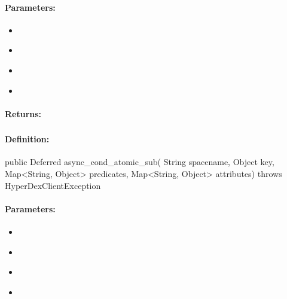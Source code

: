 \paragraph{Parameters:}
\begin{itemize}[noitemsep]
\item {}\\

\item {}\\

\item {}\\

\item {}\\

\end{itemize}

\paragraph{Returns:}


\pagebreak
\subsubsection{}
\label{api:java:async_cond_atomic_sub}


\paragraph{Definition:}
\begin{javacode}
public Deferred async_cond_atomic_sub(
        String spacename,
        Object key,
        Map<String, Object> predicates,
        Map<String, Object> attributes) throws HyperDexClientException
\end{javacode}

\paragraph{Parameters:}
\begin{itemize}[noitemsep]
\item {}\\

\item {}\\

\item {}\\

\item {}\\

\end{itemize}

